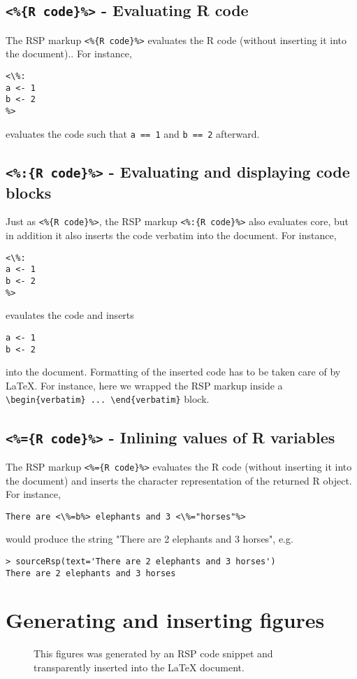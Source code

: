 \documentclass[letter,12pt]{article}
\newcommand{\code}[1]{\texttt{#1}}
\begin{document}
\subsection{\code{<\%\{R code\}\%>} - Evaluating R code}
The RSP markup \code{<\%\{R code\}\%>} evaluates the R code (without inserting it into the document)..  For instance,
\begin{verbatim}
<\%:
a <- 1
b <- 2
%>
\end{verbatim}
evaluates the code such that \code{a == 1} and \code{b == 2} afterward.


\subsection{\code{<\%:\{R code\}\%>} - Evaluating and displaying code blocks}
Just as \code{<\%\{R code\}\%>}, the RSP markup \code{<\%:\{R code\}\%>} also evaluates core, but in addition it also inserts the code verbatim into the document.  For instance,
\begin{verbatim}
<\%:
a <- 1
b <- 2
%>
\end{verbatim}
evaulates the code and inserts
\begin{verbatim}
a <- 1
b <- 2
\end{verbatim}
into the document.  Formatting of the inserted code has to be taken care of by LaTeX.  For instance, here we wrapped the RSP markup inside a \code{{\textbackslash}begin\{verbatim\} ... {\textbackslash}end\{verbatim\}} block.


\subsection{\code{<\%=\{R code\}\%>} - Inlining values of R variables}
The RSP markup \code{<\%=\{R code\}\%>} evaluates the R code (without inserting it into the document) and inserts the character representation of the returned R object.  For instance,
\begin{verbatim}
There are <\%=b%> elephants and 3 <\%="horses"%>
\end{verbatim}
would produce the string "There are 2 elephants and 3 horses", e.g.
\begin{verbatim}
> sourceRsp(text='There are 2 elephants and 3 horses')
There are 2 elephants and 3 horses
\end{verbatim}


\section{Generating and inserting figures}

\begin{figure}[htp]
 \begin{center}
 \end{center}
 \caption{This figures was generated by an RSP code snippet and transparently inserted into the LaTeX document.}
 \label{fig:MyFigure}
\end{figure}
\end{document}
